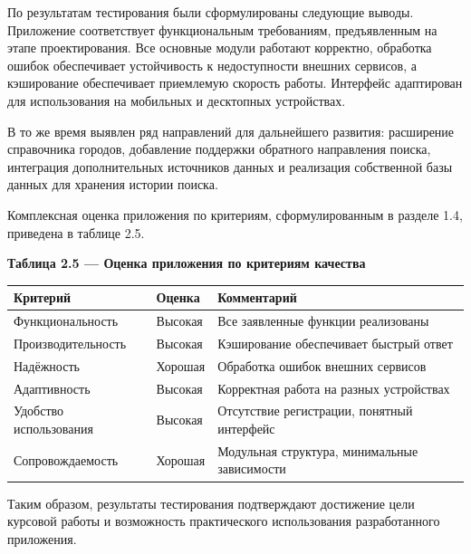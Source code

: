 \documentclass[14pt,a4paper,oneside]{extreport}
\begin{document}
По результатам тестирования были сформулированы следующие выводы. Приложение соответствует функциональным требованиям, предъявленным на этапе проектирования. Все основные модули работают корректно, обработка ошибок обеспечивает устойчивость к недоступности внешних сервисов, а кэширование обеспечивает приемлемую скорость работы. Интерфейс адаптирован для использования на мобильных и десктопных устройствах.

В то же время выявлен ряд направлений для дальнейшего развития: расширение справочника городов, добавление поддержки обратного направления поиска, интеграция дополнительных источников данных и реализация собственной базы данных для хранения истории поиска.

Комплексная оценка приложения по критериям, сформулированным в разделе 1.4, приведена в таблице 2.5.

\begin{table}[htbp]\centering

\textbf{Таблица 2.5 — Оценка приложения по критериям качества}\par\vspace{4pt}

\begin{center}
\small
\begin{tabularx}{\textwidth}{|X|X|X|}
\hline
Критерий & Оценка & Комментарий \\
\hline
Функциональность & Высокая & Все заявленные функции реализованы \\
\hline
Производительность & Высокая & Кэширование обеспечивает быстрый ответ \\
\hline
Надёжность & Хорошая & Обработка ошибок внешних сервисов \\
\hline
Адаптивность & Высокая & Корректная работа на разных устройствах \\
\hline
Удобство использования & Высокая & Отсутствие регистрации, понятный интерфейс \\
\hline
Сопровождаемость & Хорошая & Модульная структура, минимальные зависимости \\
\hline
\end{tabularx}
\end{center}

\end{table}

Таким образом, результаты тестирования подтверждают достижение цели курсовой работы и возможность практического использования разработанного приложения.

\end{document}
